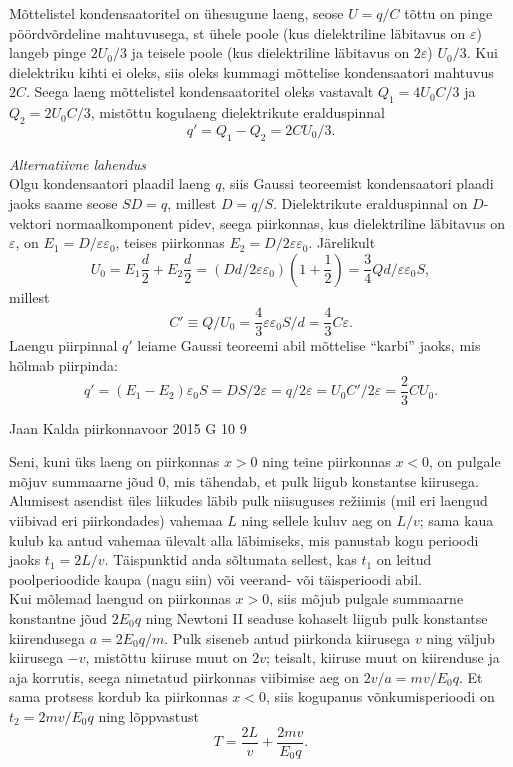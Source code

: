 \documentclass[11pt]{article}
\begin{document}
{{Mõttelistel kondensaatoritel on ühesugune laeng, seose $U=q/C$ tõttu on pinge pöördvõrdeline mahtuvusega, st ühele poole (kus dielektriline läbitavus on $\varepsilon$) langeb pinge $2U_0/3$ ja teisele poole (kus dielektriline läbitavus on $2\varepsilon$) $U_0/3$. Kui dielektriku kihti ei oleks, siis oleks kummagi mõttelise kondensaatori mahtuvus $2C$. Seega laeng mõttelistel kondensaatoritel oleks vastavalt $Q_1=4U_0C/3$ ja $Q_2=2U_0C/3$, mistõttu kogulaeng dielektrikute eralduspinnal
\[
q'=Q_1-Q_2=2CU_0/3.
\]
\vspace{0.5\baselineskip}

\emph{Alternatiivne lahendus}\\
Olgu kondensaatori plaadil laeng $q$, siis Gaussi teoreemist kondensaatori plaadi jaoks saame seose $SD=q$, millest $D=q/S$. Dielektrikute eralduspinnal on $D$-vektori normaalkomponent pidev, seega piirkonnas, kus dielektriline läbitavus on $\varepsilon$, on $E_1=D/\varepsilon\varepsilon_0$, teises piirkonnas $E_2=D/2\varepsilon\varepsilon_0$. Järelikult
\[
U_0=E_1\frac d2+E_2\frac d2=(Dd/2\varepsilon\varepsilon_0)(1+\frac 12)=\frac 34Qd/\varepsilon\varepsilon_0S,
\]
millest
\[
C'\equiv Q/U_0=\frac 43\varepsilon\varepsilon_0S/d=\frac 43C\varepsilon.
\]
Laengu piirpinnal $q'$ leiame Gaussi teoreemi abil mõttelise \enquote{karbi} jaoks, mis hõlmab piirpinda: 
\[
q'=(E_1-E_2)\varepsilon_0S=DS/2\varepsilon=q/2\varepsilon=U_0C'/2\varepsilon=\frac 23CU_0.
\]
\fi
}

{Jaan Kalda} %
{piirkonnavoor} %
{2015} %
{G 10} %
{9} %
{

\ifSolution
\osa Seni, kuni üks laeng on piirkonnas $x>0$ ning teine piirkonnas $x<0$, on pulgale mõjuv summaarne jõud \num{0}, mis tähendab, et pulk liigub konstantse kiirusega. \\
Alumisest asendist üles liikudes läbib pulk niisuguses re\v ziimis
(mil eri laengud viibivad eri piirkondades) vahemaa $L$ ning
sellele kuluv aeg on $L/v$; sama kaua kulub ka antud vahemaa ülevalt alla
läbimiseks, mis panustab kogu perioodi jaoks $t_1=2L/v$.
Täispunktid anda sõltumata sellest, kas $t_1$ on leitud poolperioodide kaupa (nagu siin) või veerand- või täisperioodi abil.\\
Kui mõlemad laengud on piirkonnas $x> 0$, siis mõjub pulgale summaarne konstantne jõud $2E_0q$
ning Newtoni II seaduse kohaselt liigub pulk konstantse kiirendusega
$a=2E_0q/m$. Pulk siseneb antud piirkonda kiirusega $v$ ning väljub kiirusega $-v$, mistõttu kiiruse muut on $2v$; teisalt,
kiiruse muut on kiirenduse ja aja korrutis, seega nimetatud piirkonnas viibimise
aeg on $2v/a=mv/E_0q$. Et sama protsess kordub ka piirkonnas $x<0$, siis
kogupanus võnkumisperioodi on $t_2=2mv/E_0q$ ning lõppvastust
\[ T=\frac{2L}v+\frac {2mv}{E_0q}. \]

}}
\end{document}
